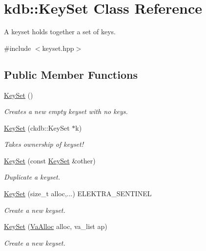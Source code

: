 \hypertarget{classkdb_1_1KeySet}{}\section{kdb\+:\+:Key\+Set Class Reference}
\label{classkdb_1_1KeySet}


A keyset holds together a set of keys.  




{\ttfamily \#include $<$keyset.\+hpp$>$}

\subsection*{Public Member Functions}
\begin{DoxyCompactItemize}
\item 
\hyperlink{classkdb_1_1KeySet_a4eac9850fa4f06c07a5306befc3e4377}{Key\+Set} ()
\begin{DoxyCompactList}\small\item\em Creates a new empty keyset with no keys. \end{DoxyCompactList}\item 
\hyperlink{classkdb_1_1KeySet_a21f651ff310178951402038e590743e0}{Key\+Set} (ckdb\+::\+Key\+Set $\ast$k)
\begin{DoxyCompactList}\small\item\em Takes ownership of keyset! \end{DoxyCompactList}\item 
\hyperlink{classkdb_1_1KeySet_ad8d6df839ab852fded1739ff3398d0b1}{Key\+Set} (const \hyperlink{classkdb_1_1KeySet}{Key\+Set} \&other)
\begin{DoxyCompactList}\small\item\em Duplicate a keyset. \end{DoxyCompactList}\item 
\hyperlink{classkdb_1_1KeySet_a6191e93cdd67bbca63df934498d191ba}{Key\+Set} (size\+\_\+t alloc,...) E\+L\+E\+K\+T\+R\+A\+\_\+\+S\+E\+N\+T\+I\+N\+EL
\begin{DoxyCompactList}\small\item\em Create a new keyset. \end{DoxyCompactList}\item 
\hyperlink{classkdb_1_1KeySet_ae0b2996803b9c9124cf791a1d738855c}{Key\+Set} (\hyperlink{structkdb_1_1VaAlloc}{Va\+Alloc} alloc, va\+\_\+list ap)
\begin{DoxyCompactList}\small\item\em Create a new keyset. \end{DoxyCompactList}\item 

\end{DoxyCompactItemize}
